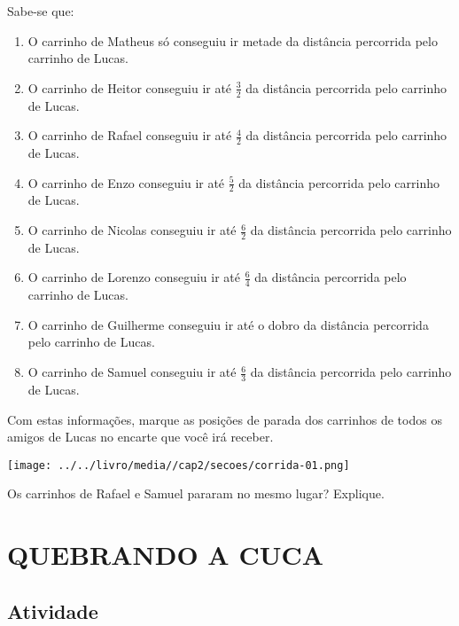 \documentclass[a4,12pt]{book}
\begin{document}
Sabe-se que:

\begin{enumerate} [\quad a)] %
  \item     O carrinho de Matheus só conseguiu ir metade da distância percorrida pelo carrinho de Lucas.
  \item     O carrinho de Heitor conseguiu ir até     $\frac{3}{2}$     da distância percorrida pelo carrinho de Lucas. 
  \item     O carrinho de Rafael conseguiu ir até     $\frac{4}{2}$     da distância percorrida pelo carrinho de Lucas.
  \item     O carrinho de Enzo conseguiu ir até     $\frac{5}{2}$     da distância percorrida pelo carrinho de Lucas. 
  \item     O carrinho de Nicolas conseguiu ir até     $\frac{6}{2}$     da distância percorrida pelo carrinho de Lucas. 
  \item     O carrinho de Lorenzo conseguiu ir até     $\frac{6}{4}$     da distância percorrida pelo carrinho de Lucas. 
  \item     O carrinho de Guilherme conseguiu ir até o dobro da distância percorrida pelo carrinho de Lucas.
  \item     O carrinho de Samuel conseguiu ir até     $\frac{6}{3}$     da distância percorrida pelo carrinho de Lucas. 
\end{enumerate} %


Com estas informações, marque as posições de parada dos carrinhos de todos os amigos de Lucas no encarte que você irá receber.

\texttt{[image: ../../livro/media//cap2/secoes/corrida-01.png]}

Os carrinhos de Rafael e Samuel pararam no mesmo lugar? Explique.















\section*{QUEBRANDO A CUCA }



\subsection{Atividade}
\end{document}
